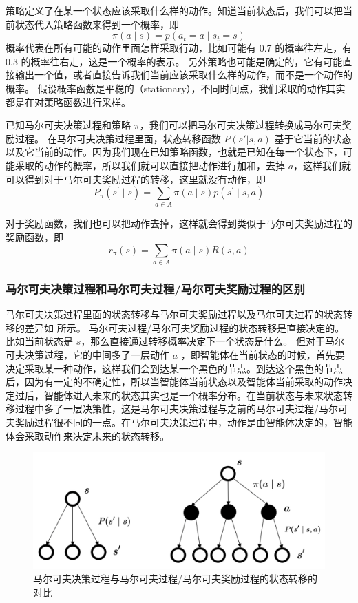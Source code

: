 策略定义了在某一个状态应该采取什么样的动作。知道当前状态后，我们可以把当前状态代入策略函数来得到一个概率，即 
\begin{equation}
  \pi(a \mid s)=p\left(a_{t}=a \mid s_{t}=s\right)
  \label{eq:}
\end{equation}
概率代表在所有可能的动作里面怎样采取行动，比如可能有 0.7 的概率往左走，有 0.3 的概率往右走，这是一个概率的表示。
另外策略也可能是确定的，它有可能直接输出一个值，或者直接告诉我们当前应该采取什么样的动作，而不是一个动作的概率。
假设概率函数是平稳的（stationary），不同时间点，我们采取的动作其实都是在对策略函数进行采样。

已知马尔可夫决策过程和策略 $\pi$，我们可以把马尔可夫决策过程转换成马尔可夫奖励过程。
在马尔可夫决策过程里面，状态转移函数 $P(s'|s,a)$ 基于它当前的状态以及它当前的动作。因为我们现在已知策略函数，也就是已知在每一个状态下，可能采取的动作的概率，所以我们就可以直接把动作进行加和，去掉 $a$，这样我们就可以得到对于马尔可夫奖励过程的转移，这里就没有动作，即
\begin{equation}
  P_{\pi}\left(s^{\prime} \mid s\right)=\sum_{a \in A} \pi(a \mid s) p\left(s^{\prime} \mid s, a\right)
  \label{eq:}
\end{equation}

对于奖励函数，我们也可以把动作去掉，这样就会得到类似于马尔可夫奖励过程的奖励函数，即
\begin{equation}
  r_{\pi}(s)=\sum_{a \in A} \pi(a \mid s) R(s, a)
  \label{eq:}
\end{equation}

\subsubsection{马尔可夫决策过程和马尔可夫过程/马尔可夫奖励过程的区别} 
马尔可夫决策过程里面的状态转移与马尔可夫奖励过程以及马尔可夫过程的状态转移的差异如 所示。
马尔可夫过程/马尔可夫奖励过程的状态转移是直接决定的。比如当前状态是 $s$，那么直接通过转移概率决定下一个状态是什么。
但对于马尔可夫决策过程，它的中间多了一层动作 $a$ ，即智能体在当前状态的时候，首先要决定采取某一种动作，这样我们会到达某一个黑色的节点。到达这个黑色的节点后，因为有一定的不确定性，所以当智能体当前状态以及智能体当前采取的动作决定过后，智能体进入未来的状态其实也是一个概率分布。在当前状态与未来状态转移过程中多了一层决策性，这是马尔可夫决策过程与之前的马尔可夫过程/马尔可夫奖励过程很不同的一点。在马尔可夫决策过程中，动作是由智能体决定的，智能体会采取动作来决定未来的状态转移。

\begin{figure}[hbt]
  \centering
  \includegraphics[width=0.6\linewidth]{res/ch2/2.21}
  \caption{马尔可夫决策过程与马尔可夫过程/马尔可夫奖励过程的状态转移的对比}
  \label{fig:fig2.21}
\end{figure}

